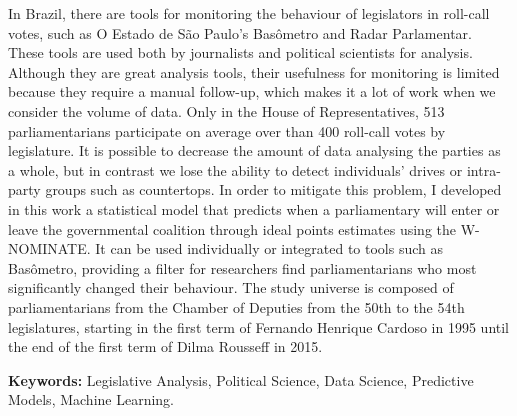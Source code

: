 In Brazil, there are tools for monitoring the behaviour of legislators in
roll-call votes, such as O Estado de São Paulo's Basômetro and Radar
Parlamentar. These tools are used both by journalists and political scientists
for analysis.
 Although they are great analysis tools, their usefulness for monitoring is
limited because they require a manual follow-up, which makes it a lot of work
when we consider the volume of data. Only in the House of Representatives, 513
parliamentarians participate on average over than 400 roll-call votes by
legislature. It is possible to decrease the amount of data analysing the
parties as a whole, but in contrast we lose the ability to detect individuals'
drives or intra-party groups such as countertops.
 In order to mitigate this problem, I developed in this work a statistical
model that predicts when a parliamentary will enter or leave the governmental
coalition through ideal points estimates using the W-NOMINATE. It can be used
individually or integrated to tools such as Basômetro, providing a filter for
researchers find parliamentarians who most significantly changed their
behaviour.
 The study universe is composed of parliamentarians from the Chamber of
Deputies from the 50th to the 54th legislatures, starting in the first term of
Fernando Henrique Cardoso in 1995 until the end of the first term of Dilma
Rousseff in 2015.

\textbf{Keywords:} Legislative Analysis, Political Science, Data Science,
Predictive Models, Machine Learning.
